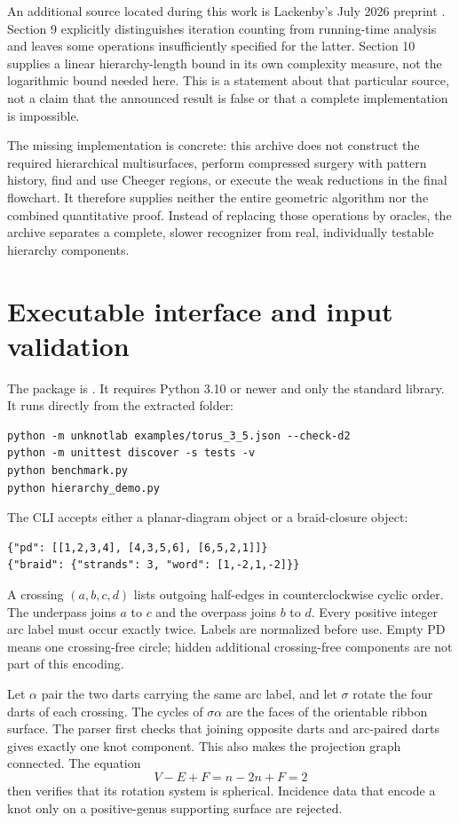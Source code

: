 \documentclass[11pt]{article}
\theoremstyle{remark}\newtheorem{remark}[theorem]{Remark}
\newcommand{\code}[1]{\texttt{\detokenize{#1}}}
\begin{document}
An additional source located during this work is Lackenby's July 2026 preprint
\cite{lackenby2026}. Section 9 explicitly distinguishes iteration counting from
running-time analysis and leaves some operations insufficiently specified for
the latter. Section 10 supplies a linear hierarchy-length bound in its own
complexity measure, not the logarithmic bound needed here. This is a statement
about that particular source, not a claim that the announced result is false
or that a complete implementation is impossible.

The missing implementation is concrete: this archive does not construct the
required hierarchical multisurfaces, perform compressed surgery with pattern
history, find and use Cheeger regions, or execute the weak reductions in the
final flowchart. It therefore supplies neither the entire geometric algorithm
nor the combined quantitative proof. Instead of replacing those operations by
oracles, the archive separates a complete, slower recognizer from real,
individually testable hierarchy components.

\section{Executable interface and input validation}
The package is \code{unknotlab}. It requires Python 3.10 or newer and only the
standard library. It runs directly from the extracted folder:
\begin{lstlisting}
python -m unknotlab examples/torus_3_5.json --check-d2
python -m unittest discover -s tests -v
python benchmark.py
python hierarchy_demo.py
\end{lstlisting}
The CLI accepts either a planar-diagram object or a braid-closure object:
\begin{lstlisting}
{"pd": [[1,2,3,4], [4,3,5,6], [6,5,2,1]]}
{"braid": {"strands": 3, "word": [1,-2,1,-2]}}
\end{lstlisting}
A crossing $(a,b,c,d)$ lists outgoing half-edges in counterclockwise cyclic
order. The underpass joins $a$ to $c$ and the overpass joins $b$ to $d$.
Every positive integer arc label must occur exactly twice. Labels are normalized
before use. Empty PD means one crossing-free circle; hidden additional
crossing-free components are not part of this encoding.

Let $\alpha$ pair the two darts carrying the same arc label, and let $\sigma$
rotate the four darts of each crossing. The cycles of $\sigma\alpha$ are the
faces of the orientable ribbon surface. The parser first checks that joining
opposite darts and arc-paired darts gives exactly one knot component. This
also makes the projection graph connected. The equation
\[
 V-E+F=n-2n+F=2
\]
then verifies that its rotation system is spherical. Incidence data that
encode a knot only on a positive-genus supporting surface are rejected.
\end{document}
